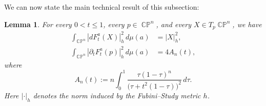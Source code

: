 \documentclass[11pt]{article}
\theoremstyle{plain}
\numberwithin{equation}{section}
\newtheorem{lemma}[theorem]{Lemma}
\theoremstyle{definition}
\DeclareMathOperator{\CP}{\mathbb{CP}}
\begin{document}
We can now state the main technical result of this subsection:

\begin{lemma}
\label{lem:averageFt}
For every $0<t\leq1$, every $p\in\CP^n$, and every $X\in T_p\CP^n$, we have
\begin{align}
\label{eq:avg_ang}
    \int_{\CP^n}|dF_t^a(X)|_h^2\,d\mu(a)&=|X|_h^2,\\
\label{eq:avg_rad}
    \int_{\CP^n}|\partial_tF_t^a(p)|_h^2\,d\mu(a)&=4A_n(t),
\end{align}
where
\begin{equation}
\label{eq:defAn}
    A_n(t):=n\int_0^1
    \frac{\tau(1-\tau)^n}
    {\bigl(\tau+t^2(1-\tau)\bigr)^2}\,d\tau.
\end{equation}
Here $|\cdot|_h$ denotes the norm induced by the Fubini--Study metric
$h$.
\end{lemma}
\end{document}

